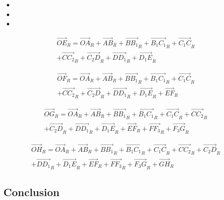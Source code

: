 \documentclass[12pt,a4paper]{article}
\begin{document}
\begin{itemize}
	\item
	\item 
	\item 
\end{itemize}


\medbreak

\medbreak

\medbreak

\medbreak




\begin{equation}
	\begin{split}
		\vec{OE}_R=\vec{OA}_R+\vec{AB}_R+\vec{B B_1}_R+\vec{B_1 C_1}_R+\vec{C_1 C}_R\\+\vec{C C_2}_R+\vec{C_2 D}_R+\vec{D D_1}_R+\vec{D_1 E}_R
	\end{split}
\end{equation}

\begin{equation}
	\begin{split}
		\vec{OF}_R=\vec{OA}_R+\vec{AB}_R+\vec{B B_1}_R+\vec{B_1 C_1}_R+\vec{C_1 C}_R\\+\vec{C C_2}_R+\vec{C_2 D}_R+\vec{D D_1}_R+\vec{D_1 E}_R+\vec{E F}_R
	\end{split}
\end{equation}

\begin{equation}
	\begin{split}
		\vec{OG}_R=\vec{OA}_R+\vec{AB}_R+\vec{B B_1}_R+\vec{B_1 C_1}_R+\vec{C_1 C}_R+\vec{C C_2}_R\\+\vec{C_2 D}_R+\vec{D D_1}_R+\vec{D_1 E}_R+\vec{E F}_R+\vec{F F_3}_R+\vec{F_3 G}_R
	\end{split}
\end{equation}

\begin{equation}
	\begin{split}
		\vec{OH}_R=\vec{OA}_R+\vec{AB}_R+\vec{B B_1}_R+\vec{B_1 C_1}_R+\vec{C_1 C}_R+\vec{C C_2}_R+\vec{C_2 D}_R\\+\vec{D D_1}_R+\vec{D_1 E}_R+\vec{E F}_R+\vec{F F_3}_R+\vec{F_3 G}_R+\vec{G H}_R
	\end{split}
\end{equation}


\subsection{Conclusion}
\end{document}
